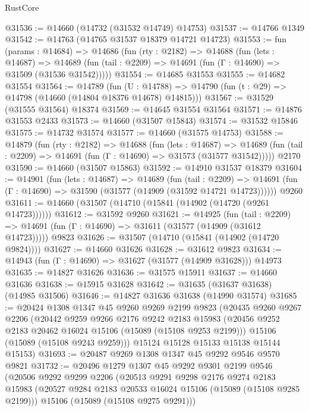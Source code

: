 \begin{lexlean}{RustCore}
\begin{coremodule}
@31536 := @14660 (@14732 (@31532 @14749) @14753)
@31537 := @14766 @1349
@31542 := @14763 (@14765 @31537 @18379 @14721 @14723)
@31553 := fun (params : @14684) =>
  @14686
    (fun (rty : @2182) =>
    @14688
      (fun (lets : @14687) =>
      @14689 (fun (tail : @2209) => @14691 (fun (Γ : @14690) => @31509 (@31536 @31542)))))
@31554 := @14685 @31553
@31555 := @14682 @31554
@31564 := @14789
    (fun (U : @14788) => @14790 (fun (t : @29) => @14798 (@14660 (@14804 @18376 @14678) @14815)))
@31567 := @31529 (@31555 @31564) @18374
@31569 := @14645 @31554 @31564
@31571 := @14876 @31553 @2433
@31573 := @14660 (@31507 @15843)
@31574 := @31532 @15846
@31575 := @14732 @31574
@31577 := @14660 (@31575 @14753)
@31588 := @14879
    (fun (rty : @2182) =>
    @14688
      (fun (lets : @14687) =>
      @14689 (fun (tail : @2209) => @14691 (fun (Γ : @14690) => @31573 (@31577 @31542)))))
    @2170
@31590 := @14660 (@31507 @15863)
@31592 := @14910 @31537 @18379
@31604 := @14901
    (fun (lets : @14687) =>
    @14689
      (fun (tail : @2209) =>
      @14691 (fun (Γ : @14690) => @31590 (@31577 (@14909 (@31592 @14721 @14723))))))
    @9260
@31611 := @14660 (@31507 (@14710 (@15841 (@14902 (@14720 (@9261 @14723))))))
@31612 := @31592 @9260
@31621 := @14925
    (fun (tail : @2209) => @14691 (fun (Γ : @14690) => @31611 (@31577 (@14909 (@31612 @14723)))))
    @9823
@31626 := @31507 (@14710 (@15841 (@14902 (@14720 @9824))))
@31627 := @14660 @31626
@31628 := @31612 @9823
@31634 := @14943 (fun (Γ : @14690) => @31627 (@31577 (@14909 @31628))) @14973
@31635 := @14827 @31626
@31636 := @31575 @15911
@31637 := @14660 @31636
@31638 := @15915 @31628
@31642 := @31635 (@31637 @31638) (@14985 @31506)
@31646 := @14827 @31636 @31638 (@14990 @31574)
@31685 := @20424
    @1308
    @1347
    @45
    @9260
    @9269
    @2199
    @9823
    (@20435
      @9260
      @9267
      @2206
      (@20442
        @9259
        @9266
        @2176
        @9242
        @2183
        @15983
        (@20456 @9252 @2183 @20462 @16024 @15106 (@15089 (@15108 @9253 @2199)))
        @15106
        (@15089 (@15108 @9243 @9259)))
      @15124
      @15128
      @15133
      @15138
      @15144
      @15153)
@31693 := @20487 @9269 @1308 @1347 @45 @9292 @9546 @9570 @9821
@31732 := @20496
    @1279
    @1307
    @45
    @9292
    @9301
    @2199
    @9546
    (@20506
      @9292
      @9299
      @2206
      (@20513
        @9291
        @9298
        @2176
        @9274
        @2183
        @15983
        (@20527 @9284 @2183 @20533 @16024 @15106 (@15089 (@15108 @9285 @2199)))
        @15106
        (@15089 (@15108 @9275 @9291)))

\end{coremodule}
\end{lexlean}
